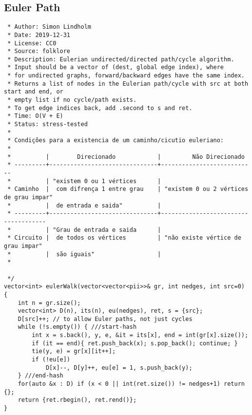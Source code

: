 \documentclass[11pt, a4paper, twoside]{article}
\begin{document}
\subsection{Euler Path}
\begin{verbatim}
 * Author: Simon Lindholm
 * Date: 2019-12-31
 * License: CC0
 * Source: folklore
 * Description: Eulerian undirected/directed path/cycle algorithm.
 * Input should be a vector of (dest, global edge index), where
 * for undirected graphs, forward/backward edges have the same index.
 * Returns a list of nodes in the Eulerian path/cycle with src at both start and end, or
 * empty list if no cycle/path exists.
 * To get edge indices back, add .second to s and ret.
 * Time: O(V + E)
 * Status: stress-tested
 * 
 * Condições para a existencia de um caminho/cicutio euleriano:
 * 
 *          |        Direcionado            |         Não Direcionado
 * ---------+-------------------------------+---------------------------
 *          | "existem 0 ou 1 vértices      |   
 * Caminho  |  com difrença 1 entre grau    | "existem 0 ou 2 vértices de grau impar"
 *          |  de entrada e saida"          |
 * ---------+-------------------------------+------------------------------------- 
 *          | "Grau de entrada e saida      |
 * Circuito |  de todos os vértices         | "não existe vértice de grau impar"
 *          |  são iguais"                  | 
 * 
 
 */
vector<int> eulerWalk(vector<vector<pii>>& gr, int nedges, int src=0) {
	int n = gr.size();
	vector<int> D(n), its(n), eu(nedges), ret, s = {src};
	D[src]++; // to allow Euler paths, not just cycles
	while (!s.empty()) { ///start-hash
		int x = s.back(), y, e, &it = its[x], end = int(gr[x].size());
		if (it == end){ ret.push_back(x); s.pop_back(); continue; }
		tie(y, e) = gr[x][it++];
		if (!eu[e])
			D[x]--, D[y]++, eu[e] = 1, s.push_back(y);
	} ///end-hash
	for(auto &x : D) if (x < 0 || int(ret.size()) != nedges+1) return {};
	return {ret.rbegin(), ret.rend()};
}
\end{verbatim}
\end{document}
